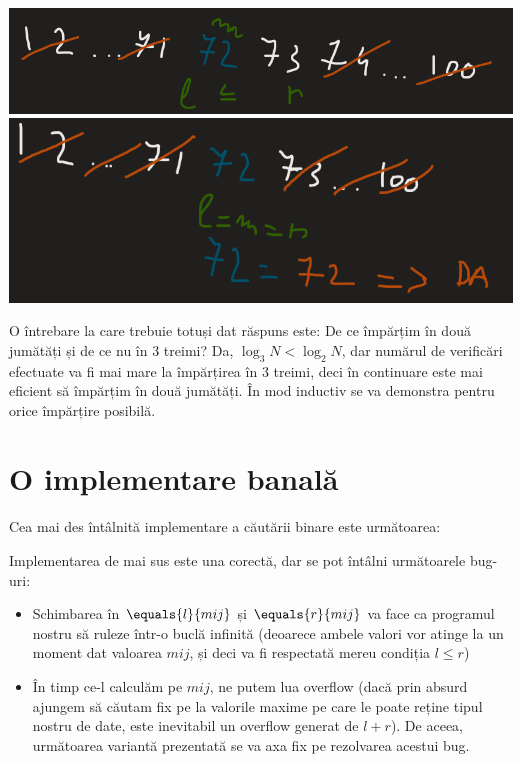 \begin{center}
\includegraphics[width=\textwidth]{images/cautari/cb7.png}
\includegraphics[width=\textwidth]{images/cautari/cb8.png}
\end{center}

O întrebare la care trebuie totuși dat răspuns este: De ce împărțim în două jumătăți și de ce nu în $3$ treimi? Da, $\log_3 N < \log_2 N$, dar numărul de verificări efectuate va fi mai mare la împărțirea în $3$ treimi, deci în continuare este mai eficient să împărțim în două jumătăți. În mod inductiv se va demonstra pentru orice împărțire posibilă.

\section{O implementare banală}
Cea mai des întâlnită implementare a căutării binare este următoarea:

Implementarea de mai sus este una corectă, dar se pot întâlni următoarele bug-uri:
\begin{itemize}
    \item Schimbarea în $\equals{l}{mij}$ și $\equals{r}{mij}$ va face ca programul nostru să ruleze într-o buclă infinită (deoarece ambele valori vor atinge la un moment dat valoarea $mij$, și deci va fi respectată mereu condiția $l \leq r$)
    \item În timp ce-l calculăm pe $mij$, ne putem lua overflow (dacă prin absurd ajungem să căutam fix pe la valorile maxime pe care le poate reține tipul nostru de date, este inevitabil un overflow generat de $l + r$). De aceea, următoarea variantă prezentată se va axa fix pe rezolvarea acestui bug.
\end{itemize}

